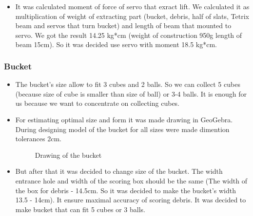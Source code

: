 \begin{itemize}
\item It was calculated moment of force of servo that exract lift. We calculated it as multiplication of weight of extracting part (bucket, debris, half of slats, Tetrix beam and servos that turn bucket) and length of beam that mounted to servo. We got the result 14.25 kg*cm (weight of construction 950g length of beam 15cm). So it was decided use servo with moment 18.5 kg*cm.
\end{itemize}
\fillpage

\subsubsection{Bucket} 
\begin{itemize}
\item The bucket's size allow to fit 3 cubes and 2 balls. So we can collect 5 cubes (because size of cube is smaller than size of ball) or 3-4 balls. It is enough for us because we want to concentrate on collecting cubes. 
\item For estimating optimal size and form it was made drawing in GeoGebra. During designing model of the bucket for all sizes were made dimention tolerances 2cm.
\begin{figure}[H]
	\begin{minipage}[h]{\linewidth}
		\caption{Drawing of the bucket}
	\end{minipage}
\end{figure} 
\item But after that it was decided to change size of the bucket. The width entrance hole and width of the scoring box should be the same (The width of the box for debris - 14.5cm. So it was decided to make the bucket's width 13.5 - 14cm). It ensure maximal accuracy of scoring debris. It was decided to make bucket that can fit 5 cubes or 3 balls.

\end{itemize}
